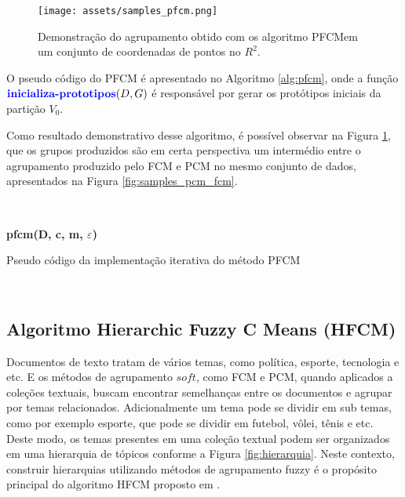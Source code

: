 \begin{figure}[!htp] 
  \centering 
  \texttt{[image: assets/samples\_pfcm.png]}
  \caption{Demonstração do agrupamento obtido com os algoritmo 
    PFCM\protect\footnotemark em um conjunto de coordenadas de pontos no $R^2$.} 
  \label{fig:samples_pfcm} 
\end{figure}

O pseudo código do PFCM é apresentado no Algoritmo \ref{alg:pfcm}, onde a função \\
$\textbf{\color{blue}inicializa-prototipos}(D,G)$ é responsável por gerar os protótipos iniciais
da partição $V_0$.

Como resultado demonstrativo desse algoritmo, é possível observar na Figura \ref{fig:samples_pfcm},
que os grupos produzidos são em certa perspectiva um intermédio entre o agrupamento produzido pelo
FCM e PCM no mesmo conjunto de dados, apresentados na Figura \ref{fig:samples_pcm_fcm}.

\leavevmode\\
\begin{algorithm}[H] 
  \SetAlgoLined
  \textbf{{\color{blue}pfcm}(D, c, m, $\varepsilon$)}\\
  \caption{Pseudo código da implementação iterativa do método PFCM}
  \label{alg:pfcm} 
\end{algorithm}
\leavevmode\\

\subsection{Algoritmo Hierarchic Fuzzy C Means (HFCM)}

Documentos de texto tratam de vários temas, como política, esporte, tecnologia e etc.
E os métodos de agrupamento $soft$, como FCM e PCM, quando aplicados a coleções textuais, buscam
encontrar semelhanças entre os documentos e agrupar por temas relacionados. Adicionalmente um
tema pode se dividir em sub temas, como por exemplo esporte, que pode se dividir em futebol,
vôlei, tênis e etc. Deste modo, os temas presentes em uma coleção textual podem ser organizados em
uma hierarquia de tópicos conforme a Figura \ref{fig:hierarquia}. Neste contexto, construir
hierarquias utilizando métodos de agrupamento fuzzy é o propósito principal do algoritmo HFCM
proposto em .

